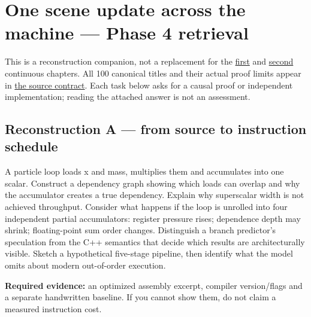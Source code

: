 \hypertarget{appendix-2587680a4fe3}{}\label{referencestart:appendix-2587680a4fe3}
\section{One scene update across the machine --- Phase 4 retrieval}\label{appendix-2587680a4fe3-one-scene-update-across-the-machine-phase-4-retrieval}

\hypertarget{appendix-2587680a4fe3-one-scene-update-across-the-machine-phase-4-retrieval}{}

This is a reconstruction companion, not a replacement for the \hyperref[01-foundations-i-ch007-from-a-correct-c-asset-service-to-the-instructions-a-cpu-can-execute-phase-4-m019m021-parts-301346]{first} and \hyperref[01-foundations-i-ch007-from-temporary-memory-to-finished-parallel-frames-phase-4-m022m024-parts-347400]{second} continuous chapters. All 100 canonical titles and their actual proof limits appear in \hyperref[appendix-fd090d982a15-phase-4-cpu-architecture-and-measured-execution-parts-301400]{the source contract}. Each task below asks for a causal proof or independent implementation; reading the attached answer is not an assessment.

\subsection{Reconstruction A --- from source to instruction schedule}\label{appendix-2587680a4fe3-reconstruction-a-from-source-to-instruction-schedule}

\hypertarget{appendix-2587680a4fe3-reconstruction-a-from-source-to-instruction-schedule}{}

A particle loop loads x and mass, multiplies them and accumulates into one scalar. Construct a dependency graph showing which loads can overlap and why the accumulator creates a true dependency. Explain why superscalar width is not achieved throughput. Consider what happens if the loop is unrolled into four independent partial accumulators: register pressure rises; dependence depth may shrink; floating-point sum order changes. Distinguish a branch predictor's speculation from the C++ semantics that decide which results are architecturally visible. Sketch a hypothetical five-stage pipeline, then identify what the model omits about modern out-of-order execution.

\textbf{Required evidence:} an optimized assembly excerpt, compiler version/flags and a separate handwritten baseline. If you cannot show them, do not claim a measured instruction cost.

